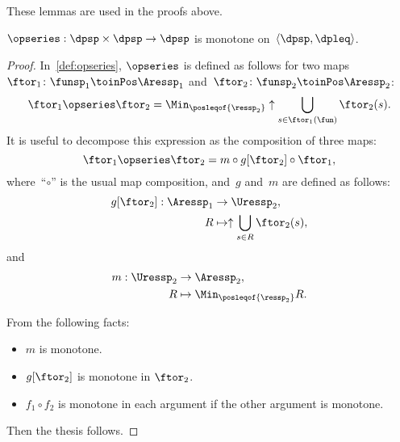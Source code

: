 These lemmas are used in the proofs above.
\begin{lemma}
	\label{lem:series-monotone}$\opseries:\dpsp\times\dpsp\rightarrow\dpsp$
	is monotone on~$\langle\dpsp,\dpleq\rangle$.
\end{lemma}
\begin{proof}
	In~\cref{def:opseries}, $\opseries$ is defined as follows
	for two maps~$\ftor_{1}\colon\funsp_{1}\toinPos\Aressp_{1}$ and~$\ftor_{2}\colon\funsp_{2}\toinPos\Aressp_{2}$:
	\[
		{\displaystyle \ftor_{1}\opseries\ftor_{2}=\Min_{\posleqof{\ressp_{2}}}\uparrow\bigcup_{s\in\ftor_{1}(\fun)}\ftor_{2}(s)}.
	\]
	It is useful to decompose this expression as the composition of three
	maps:
	\[
		\ftor_{1}\opseries\ftor_{2}=m\circ g[\ftor_{2}]\circ\ftor_{1},
	\]
	where~``$\circ$'' is the usual map composition, and~$g$ and~$m$
	are defined as follows:
	\begin{align*}
		g[\ftor_{2}]:\Aressp_{1} & \rightarrow\Uressp_{2},                      \\
		R                        & \mapsto\uparrow\bigcup_{s\in R}\ftor_{2}(s),
	\end{align*}
	and
	\begin{align*}
		m:\Uressp_{2} & \to \Aressp_{2},                    \\
		R             & \mapsto\Min_{\posleqof{\ressp_{2}}}
		R.
	\end{align*}

	From the following facts:
	\begin{itemize}
		\item $m$ is monotone.
		\item $g[\ftor_{2}]$ is monotone in $\ftor_{2}$.
		\item $f_{1}\circ f_{2}$ is monotone in each argument if the other argument
		      is monotone.
	\end{itemize}
	Then the thesis follows.
\end{proof}

